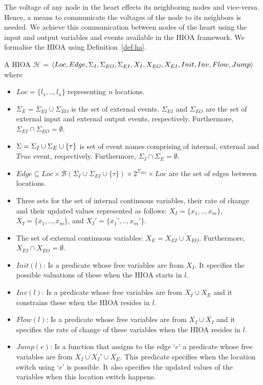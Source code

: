 The voltage of any node in the heart effects its neighboring nodes and
vice-versa. Hence, a means to communicate the voltages of the node to
its neighbors is needed. We achieve this communication between nodes of
the heart using the input and output variables and events available in
the \ac{HIOA} framework. We formalise the \ac{HIOA} using
Definition~\ref{def:ha}.


\begin{definition}
  A \acf{HIOA} \newline $\mathcal{H}$ =
  $\langle Loc, Edge, \Sigma_I, \Sigma_{EO}, \Sigma_{EI}, X_I, X_{EO},
  X_{EI}, \linebreak Init, Inv, Flow, Jump\rangle$ where
  \begin{itemize}
  \item $Loc=\{l_1,..,l_n\}$ representing $n$ locations.
  \item $\Sigma_{E} = \Sigma_{EI} \cup \Sigma_{EO}$ is the set of
    external events. $\Sigma_{EI}$ and $\Sigma_{EO}$ are the set of
    external input and external output events,
    respectively. Furthermore,
    \mbox{$\Sigma_{EI} \cap \Sigma_{EO} = \emptyset$}.
  \item $\Sigma=\Sigma_I \cup \Sigma_{E} \cup \{\tau\}$ is set of
    event names comprising of internal, external and $True$ event,
    respectively. Furthermore,
    \mbox{$\Sigma_I \cap \Sigma_E = \emptyset$}.
  \item
    $Edge \subseteq Loc \times \mathcal{B}(\Sigma_I \cup \Sigma_{EI}
    \cup \{\tau\}) \times 2^{\Sigma_{EO}} \times Loc$
    are the set of edges between locations.
  \item Three sets for the set of internal continuous variables, their
    rate of change and their updated values represented as follows:
    $X_I=\{x_1,.., x_m\}$, $\dot{X_I}=\{\dot{x_1},.., \dot{x_m}\}$, and
    $X_I'=\{x_{1}',.., x_{m}'\}$.
  \item The set of external continuous variables:
    \mbox{$X_E = X_{EI} \cup X_{EO}$}. Furthermore,
    \mbox{$X_{EI} \cap X_{EO} = \emptyset$}.
  \item $Init(l)$: Is a predicate whose free variables are from
    $X_{I}$. It specifies the possible valuations of these when the HIOA
    starts in $l$.
  \item $Inv(l)$: Is a predicate whose free variables are from
    \mbox{$X_I \cup X_{E}$} and it constrains these when the HIOA
    resides in $l$.
  \item $Flow(l)$: Is a predicate whose free variables are from
    $X_I \cup \dot{X_I}$ and it specifies the rate of change of these
    variables when the HIOA resides in $l$.
  \item $Jump(e)$: Is a function that assigns to the edge `$e$' a
    predicate whose free variables are from $X_I \cup X_I' \cup X_E$.
    This predicate specifies when the location switch using `$e$' is
    possible. It also specifies the updated values of the variables when
    this location switch happens.
  \end{itemize}
  \label{def:ha}
\end{definition}


